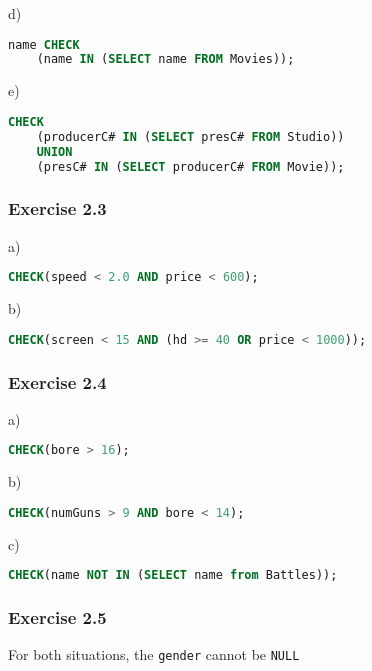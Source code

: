 \documentclass[../../main.tex]{subfiles}
\begin{document}
d)

\begin{lstlisting}[language=sql]
  name CHECK
    (name IN (SELECT name FROM Movies));
\end{lstlisting}

e)

\begin{lstlisting}[language=sql]
  CHECK
    (producerC# IN (SELECT presC# FROM Studio))
    UNION
    (presC# IN (SELECT producerC# FROM Movie));
\end{lstlisting}

\subsubsection*{Exercise 2.3}

a)

\begin{lstlisting}[language=sql]
  CHECK(speed < 2.0 AND price < 600);
\end{lstlisting}

b)

\begin{lstlisting}[language=sql]
  CHECK(screen < 15 AND (hd >= 40 OR price < 1000));
\end{lstlisting}

\subsubsection*{Exercise 2.4}

a)

\begin{lstlisting}[language=sql]
  CHECK(bore > 16);
\end{lstlisting}

b)

\begin{lstlisting}[language=sql]
  CHECK(numGuns > 9 AND bore < 14);
\end{lstlisting}

c)

\begin{lstlisting}[language=sql]
  CHECK(name NOT IN (SELECT name from Battles));
\end{lstlisting}

\subsubsection*{Exercise 2.5}

For both situations, the \verb|gender| cannot be \verb|NULL|
\end{document}
